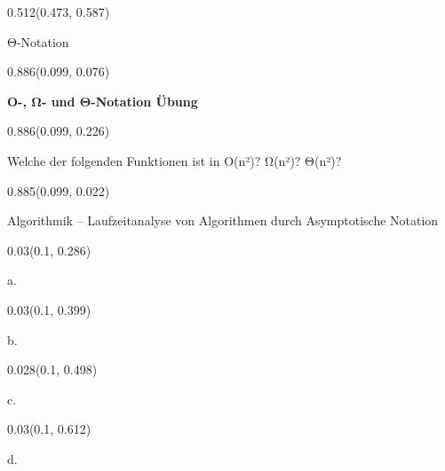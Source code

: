 \documentclass[aspectratio=169]{beamer}
\begin{document}
\begin{frame}[fragile]
\begin{textblock}{0.512}(0.473, 0.587)
  \begin{minipage}[t][0.064\paperheight]{\linewidth}
    {\tiny Θ-Notation}
  \end{minipage}
\end{textblock}
\begin{textblock}{0.886}(0.099, 0.076)
  \begin{minipage}[t][0.131\paperheight]{\linewidth}
    \textbf{O-, Ω- und Θ-Notation Übung}
  \end{minipage}
\end{textblock}
\begin{textblock}{0.886}(0.099, 0.226)
  \begin{minipage}[t][0.63\paperheight]{\linewidth}
    {\small Welche der folgenden Funktionen ist in O(n²)? Ω(n²)? Θ(n²)?}
  \end{minipage}
\end{textblock}
\begin{textblock}{0.885}(0.099, 0.022)
  \begin{minipage}[b][0.031\paperheight]{\linewidth}
    {\tiny Algorithmik – Laufzeitanalyse von Algorithmen durch Asymptotische Notation}
  \end{minipage}
\end{textblock}
\begin{textblock}{0.03}(0.1, 0.286)
  \begin{minipage}[t][0.054\paperheight]{\linewidth}
    {\tiny a.}
  \end{minipage}
\end{textblock}
\begin{textblock}{0.03}(0.1, 0.399)
  \begin{minipage}[t][0.054\paperheight]{\linewidth}
    {\tiny b.}
  \end{minipage}
\end{textblock}
\begin{textblock}{0.028}(0.1, 0.498)
  \begin{minipage}[t][0.054\paperheight]{\linewidth}
    {\tiny c.}
  \end{minipage}
\end{textblock}
\begin{textblock}{0.03}(0.1, 0.612)
  \begin{minipage}[t][0.054\paperheight]{\linewidth}
    {\tiny d.}
  \end{minipage}
\end{textblock}

\end{frame}
\end{document}
